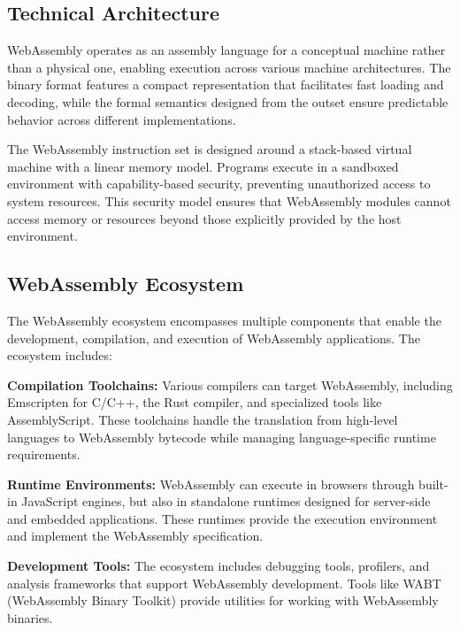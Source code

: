\subsection{Technical Architecture}
\label{subsec:wasm-architecture}

WebAssembly operates as an assembly language for a conceptual machine rather than a physical one, enabling execution across various machine architectures. The binary format features a compact representation that facilitates fast loading and decoding, while the formal semantics designed from the outset ensure predictable behavior across different implementations\cite{rossberg2018webassembly}.

The WebAssembly instruction set is designed around a stack-based virtual machine with a linear memory model. Programs execute in a sandboxed environment with capability-based security, preventing unauthorized access to system resources. This security model ensures that WebAssembly modules cannot access memory or resources beyond those explicitly provided by the host environment.


\subsection{WebAssembly Ecosystem}
\label{subsec:wasm-ecosystem}

The WebAssembly ecosystem encompasses multiple components that enable the development, compilation, and execution of WebAssembly applications. The ecosystem includes:

\textbf{Compilation Toolchains:} Various compilers can target WebAssembly, including Emscripten for C/C++, the Rust compiler, and specialized tools like AssemblyScript. These toolchains handle the translation from high-level languages to WebAssembly bytecode while managing language-specific runtime requirements.

\textbf{Runtime Environments:} WebAssembly can execute in browsers through built-in JavaScript engines, but also in standalone runtimes designed for server-side and embedded applications. These runtimes provide the execution environment and implement the WebAssembly specification.

\textbf{Development Tools:} The ecosystem includes debugging tools, profilers, and analysis frameworks that support WebAssembly development. Tools like WABT (WebAssembly Binary Toolkit) provide utilities for working with WebAssembly binaries.

